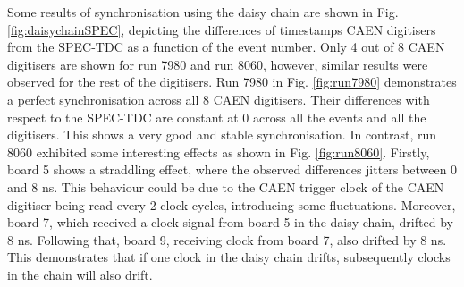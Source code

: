 Some results of synchronisation using the daisy chain are shown in Fig. \ref{fig:daisychainSPEC}, depicting the differences of timestamps CAEN digitisers from the SPEC-TDC as a function of the event 
number.
Only 4 out of 8 CAEN digitisers are shown for run 7980 and run 8060, however, similar results were observed for the rest of the digitisers.
Run 7980 in Fig. \ref{fig:run7980} demonstrates a perfect synchronisation across all 8 CAEN digitisers.
Their differences with respect to the SPEC-TDC are constant at 0 across all the events and all the digitisers.
This shows a very good and stable synchronisation.
In contrast, run 8060 exhibited some interesting effects as shown in Fig. \ref{fig:run8060}.
Firstly, board 5 shows a straddling effect, where the observed differences jitters between 0 and 8 ns.
This behaviour could be due to the CAEN trigger clock of the CAEN digitiser being read every 2 clock cycles, introducing some fluctuations.
Moreover, board 7, which received a clock signal from board 5 in the daisy chain, drifted by 8 ns.
Following that, board 9, receiving clock from board 7, also drifted by 8 ns. 
This demonstrates that if one clock in the daisy chain drifts, subsequently clocks in the chain will also drift.

